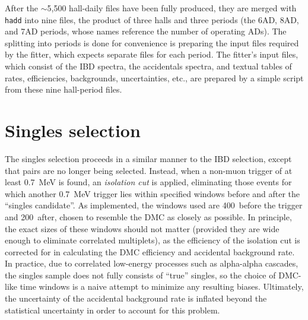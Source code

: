 \documentclass[../thesis.tex]{subfiles}
\begin{document}
After the $\sim$5,500 hall-daily files have been fully produced, they are merged
with \texttt{hadd} into nine files, the product of three halls and three periods
(the 6AD, 8AD, and 7AD periods, whose names reference the number of operating
ADs). The splitting into periods is done for convenience is preparing the input
files required by the fitter, which expects separate files for each period. The
fitter's input files, which consist of the IBD spectra, the accidentals spectra,
and textual tables of rates, efficiencies, backgrounds, uncertainties, etc., are
prepared by a simple script from these nine hall-period files.

\section{Singles selection}
\label{sec:selSingles}

The singles selection proceeds in a similar manner to the IBD selection, except
that pairs are no longer being selected. Instead, when a non-muon trigger of at
least 0.7~MeV is found, an \emph{isolation cut} is applied, eliminating those
events for which another 0.7~MeV trigger lies within specified windows before
and after the ``singles candidate''. As implemented, the windows used are
400~\us before the trigger and 200~\us after, chosen to resemble the DMC as
closely as possible. In principle, the exact sizes of these windows should not
matter (provided they are wide enough to eliminate correlated multiplets), as
the efficiency of the isolation cut is corrected for in calculating the DMC
efficiency and accidental background rate. In practice, due to correlated
low-energy processes such as alpha-alpha cascades, the singles sample does not
fully consists of ``true'' singles, so the choice of DMC-like time windows is a
naive attempt to minimize any resulting biases. Ultimately, the uncertainty of
the accidental background rate is inflated beyond the statistical uncertainty in
order to account for this problem.
\end{document}
